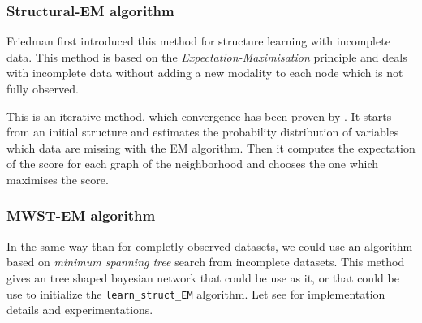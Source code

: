 \subsubsection{Structural-EM algorithm}

Friedman \cite{Fri98b} first introduced this method for structure learning with incomplete data. This method is based on the \emph{Expectation-Maximisation} principle \cite{Dem77} and deals with incomplete data without adding a new modality to each node which is not fully observed.

This is an iterative method, which convergence has been proven by \cite{Fri98b}.
It starts from an initial structure and estimates the probability distribution of variables which data are missing with the EM algorithm.
Then it computes the expectation of the score for each graph of the neighborhood and chooses the one which maximises the score.
\vspace*{-\baselineskip}


\subsubsection{MWST-EM algorithm}

In the same way than for completly observed datasets, we could use an
algorithm based on \emph{minimum spanning tree} search from incomplete
datasets.
This method gives an tree shaped bayesian network that could be use as
it, or that could be use to initialize the \texttt{learn\_struct\_EM} algorithm.
Let see \cite{Ler05} for implementation details and experimentations.
\vspace*{-\baselineskip}

